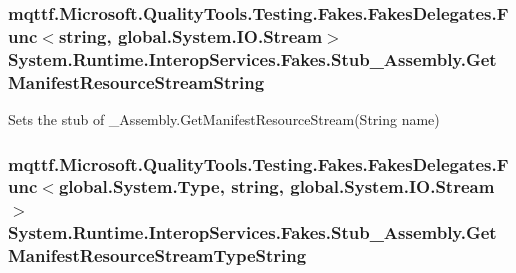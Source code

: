 \hypertarget{class_system_1_1_runtime_1_1_interop_services_1_1_fakes_1_1_stub___assembly_a499c1a246aff594f6a3874d64cef2e42}{
\subsubsection[{Get\-Manifest\-Resource\-Stream\-String}]{\setlength{\rightskip}{0pt plus 5cm}mqttf.\-Microsoft.\-Quality\-Tools.\-Testing.\-Fakes.\-Fakes\-Delegates.\-Func$<$string, global.\-System.\-I\-O.\-Stream$>$ System.\-Runtime.\-Interop\-Services.\-Fakes.\-Stub\-\_\-\-Assembly.\-Get\-Manifest\-Resource\-Stream\-String}}\label{class_system_1_1_runtime_1_1_interop_services_1_1_fakes_1_1_stub___assembly_a499c1a246aff594f6a3874d64cef2e42}


Sets the stub of \-\_\-\-Assembly.\-Get\-Manifest\-Resource\-Stream(\-String name)

\hypertarget{class_system_1_1_runtime_1_1_interop_services_1_1_fakes_1_1_stub___assembly_a9f157428f7ad695d092f7da0a9107401}{
\subsubsection[{Get\-Manifest\-Resource\-Stream\-Type\-String}]{\setlength{\rightskip}{0pt plus 5cm}mqttf.\-Microsoft.\-Quality\-Tools.\-Testing.\-Fakes.\-Fakes\-Delegates.\-Func$<$global.\-System.\-Type, string, global.\-System.\-I\-O.\-Stream$>$ System.\-Runtime.\-Interop\-Services.\-Fakes.\-Stub\-\_\-\-Assembly.\-Get\-Manifest\-Resource\-Stream\-Type\-String}}\label{class_system_1_1_runtime_1_1_interop_services_1_1_fakes_1_1_stub___assembly_a9f157428f7ad695d092f7da0a9107401}


